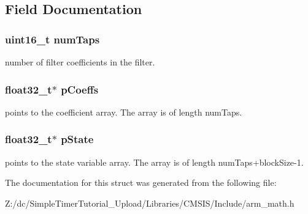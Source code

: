 \subsection{Field Documentation}
\hypertarget{structarm__fir__instance__f32_a751941891e47f522a7f5375fe8990aac}{
\subsubsection[{num\-Taps}]{\setlength{\rightskip}{0pt plus 5cm}uint16\-\_\-t num\-Taps}}\label{structarm__fir__instance__f32_a751941891e47f522a7f5375fe8990aac}
number of filter coefficients in the filter. \hypertarget{structarm__fir__instance__f32_aacbb8dd8eeba4b21fc2bb40076405ee3}{
\subsubsection[{p\-Coeffs}]{\setlength{\rightskip}{0pt plus 5cm}float32\-\_\-t$\ast$ p\-Coeffs}}\label{structarm__fir__instance__f32_aacbb8dd8eeba4b21fc2bb40076405ee3}
points to the coefficient array. The array is of length num\-Taps. \hypertarget{structarm__fir__instance__f32_a335c87e6fdc4b96601d95a5de8b9c463}{
\subsubsection[{p\-State}]{\setlength{\rightskip}{0pt plus 5cm}float32\-\_\-t$\ast$ p\-State}}\label{structarm__fir__instance__f32_a335c87e6fdc4b96601d95a5de8b9c463}
points to the state variable array. The array is of length num\-Taps+block\-Size-\/1. 

The documentation for this struct was generated from the following file\-:\begin{DoxyCompactItemize}
\item 
Z\-:/dc/\-Simple\-Timer\-Tutorial\-\_\-\-Upload/\-Libraries/\-C\-M\-S\-I\-S/\-Include/arm\-\_\-math.\-h\end{DoxyCompactItemize}
